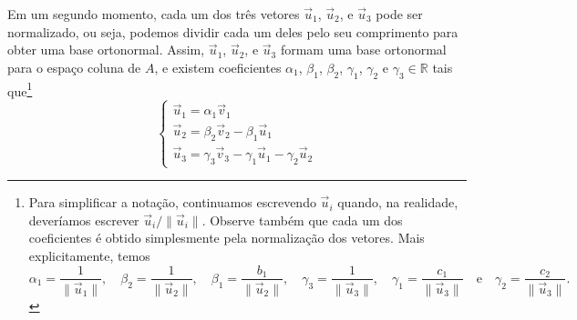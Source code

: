 Em um segundo momento, cada um dos três vetores $\vec{u}_1$, $\vec{u}_2$, e $\vec{u}_3$ pode ser normalizado, ou seja, podemos dividir cada um deles pelo seu comprimento para obter uma base ortonormal. Assim, $\vec{u}_1$, $\vec{u}_2$, e $\vec{u}_3$ formam uma base ortonormal para o espaço coluna de $A$, e existem coeficientes $\alpha_1$, $\beta_1$, $\beta_2$, $\gamma_1$, $\gamma_2$ e $\gamma_3 \in \mathbb{R}$ tais que\footnote{Para simplificar a notação, continuamos escrevendo $\vec{u}_i$ quando, na realidade, deveríamos escrever $\vec{u}_i/\|\vec{u}_i\|$. Observe também que cada um dos coeficientes é obtido simplesmente pela normalização dos vetores. Mais explicitamente, temos
\begin{equation}
\alpha_1 = \frac{1}{\|\vec{u}_1\|}, \quad \beta_2 = \frac{1}{\|\vec{u}_2\|}, \quad \beta_1 = \frac{b_1}{\|\vec{u}_2\|}, \quad \gamma_3 = \frac{1}{\|\vec{u}_3\|}, \quad \gamma_1 = \frac{c_1}{\|\vec{u}_3\|} \quad \text{e} \quad \gamma_2 = \frac{c_2}{\|\vec{u}_3\|}.
\end{equation}}
\begin{equation}
\begin{cases}
\vec{u}_1 = \alpha_1\vec{v}_1 \\
\vec{u}_2 = \beta_2 \vec{v}_2 - \beta_1 \vec{u}_1 \\
\vec{u}_3 = \gamma_3 \vec{v}_3 - \gamma_1 \vec{u}_1 - \gamma_2 \vec{u}_2
\end{cases}
\end{equation}



